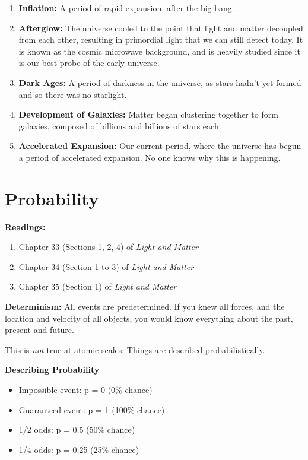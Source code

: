 \documentclass[12pt]{article}
\begin{document}
\begin{enumerate}
	\item \textbf{Inflation: }A period of rapid expansion, after the big bang.
	\item \textbf{Afterglow:} The universe cooled to the point that light and matter decoupled from each other, resulting in primordial light that we can still detect today. It is known as the cosmic microwave background, and is heavily studied since it is our best probe of the early universe.
	\item \textbf{Dark Ages: }A period of darkness in the universe, as stars hadn't yet formed and so there was no starlight.
	\item \textbf{Development of Galaxies:} Matter began clustering together to form galaxies, composed of billions and billions of stars each.
	\item \textbf{Accelerated Expansion:} Our current period, where the universe has begun a period of accelerated expansion. No one knows why this is happening.
\end{enumerate}

\clearpage

\section{Probability}

\noindent\textbf{Readings:}
\begin{enumerate}
	\item Chapter 33 (Sections 1, 2, 4) of \textit{Light and Matter}
	\item Chapter 34 (Section 1 to 3) of \textit{Light and Matter}
	\item Chapter 35 (Section 1) of \textit{Light and Matter}
\end{enumerate}

\textbf{Determinism:} All events are predetermined. If you knew all forces, and the location and velocity of all objects, you would know everything about the past, present and future.

This is \textit{not} true at atomic scales: Things are described probabilistically.

\vspace{0.1in}
\textbf{Describing Probability}

\begin{itemize}
	\item Impossible event: p = 0 (0\% chance)
	\item Guaranteed event: p = 1 (100\% chance)
	\item 1/2 odds: p = 0.5 (50\% chance)
	\item 1/4 odds: p = 0.25 (25\% chance)
\end{itemize}
\end{document}
